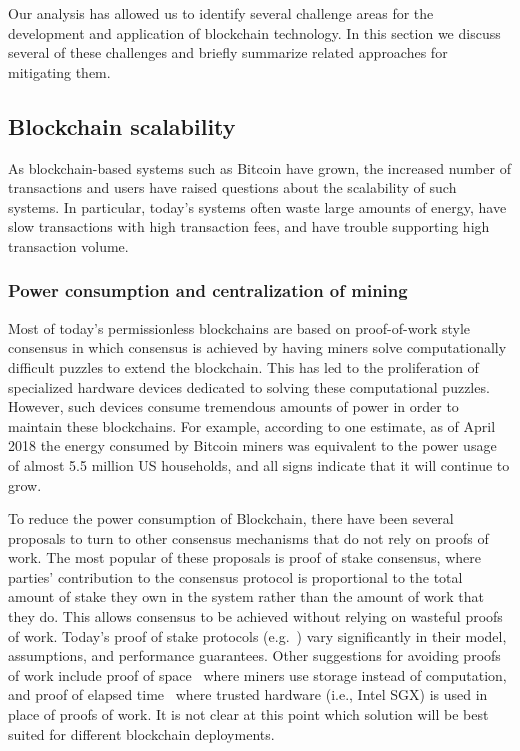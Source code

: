 Our analysis has allowed us to identify several challenge areas for the development and application of blockchain technology.  In this section we discuss several of these challenges and briefly summarize related approaches for mitigating them.

\subsection{Blockchain scalability}
As blockchain-based systems such as Bitcoin have grown, the increased number of transactions and users have raised questions about the scalability of such systems.  In particular, today's systems often waste large amounts of energy, have slow transactions with high transaction fees, and have trouble supporting high transaction volume.

\subsubsection{Power consumption and centralization of mining}
Most of today's permissionless blockchains are based on proof-of-work style consensus in which consensus is achieved by having miners solve computationally difficult puzzles to extend the blockchain.  This has led to the proliferation of specialized hardware devices dedicated to solving these computational puzzles.  However, such devices consume tremendous amounts of power in order to maintain these blockchains.  For example, according to one estimate\cite{Digiconomist}, as of April 2018 the energy consumed by Bitcoin miners was equivalent to the power usage of almost 5.5 million US households, and all signs indicate that it will continue to grow.

To reduce the power consumption of Blockchain, there have been several proposals to turn to other consensus mechanisms that do not rely on proofs of work.  The most popular of these proposals is proof of stake consensus, where parties' contribution to the consensus protocol is proportional to the total amount of stake they own in the system rather than the amount of work that they do.  This allows consensus to be achieved without relying on wasteful proofs of work.  Today's proof of stake protocols (e.g.~\cite{FC:BenGabMiz16,eprint:BenPasShi16,CRYPTO:KRDO17,SOSP:GHMVZ17}) vary significantly in their model, assumptions, and performance guarantees.  Other suggestions for avoiding proofs of work include proof of space~\cite{CRYPTO:DFKP15, eprint:PPKAFG15} where miners use storage instead of computation, and proof of elapsed time~\cite{SSS:CXSGLS17} where trusted hardware (i.e., Intel SGX) is used in place of proofs of work.  It is not clear at this point which solution will be best suited for different blockchain deployments.  

